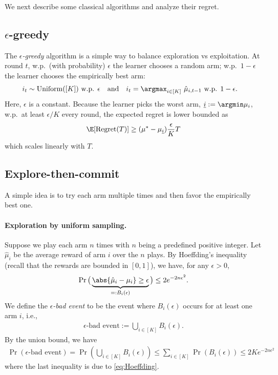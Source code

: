We next describe some classical algorithms and analyze their regret.

\subsection{$\epsilon$-greedy}
The {\em $\epsilon$-greedy} algorithm is a simple way to balance exploration vs exploitation.
At round $t$, w.p.~(with probability) $\epsilon$ the learner chooses a random arm; w.p.~$1-\epsilon$ the learner chooses the empirically best arm:
\begin{align*}
    &i_t \sim {\rm Uniform}([K]) \text{ w.p. $\epsilon$} 
    \quad \text{and} \quad 
    i_t =\textstyle\argmax_{i\in[K]}~\hat{\mu}_{i,t-1} \text{ w.p. $1-\epsilon$}.
\end{align*}
Here, $\epsilon$ is a constant.
Because the learner picks the worst arm, $\underline{i}:=\argmin \mu_i$, w.p.~at least $\epsilon/K$ every round, the expected regret is lower bounded as 
\begin{align}
\label{eq:epsilon_greedy-regret}
    \E[\Regret(T)] \geq (\mu^*-\mu_{\underline{i}})\frac{\epsilon}{K}T
\end{align}
which scales linearly with $T$.

\subsection{Explore-then-commit}
A simple idea is to try each arm multiple times and then favor the empirically best one.
\paragraph{Exploration by uniform sampling.}
Suppose we play each arm $n$ times with $n$ being a predefined positive integer. Let $\hat{\mu}_{i}$ be the average reward of arm $i$ over the $n$ plays.
By Hoeffding's inequality (recall that the rewards are bounded in $[0,1]$),  we have, for any $\epsilon>0$,
\begin{align}
\label{eq:Hoeffding}
    \Pr\big(\underbrace{\abs{\hat{\mu}_i-\mu_i} \geq \epsilon}_{=:B_i(\epsilon)}\big) \leq 2 e^{-2 n \epsilon^2}.
\end{align}
We define the {\em $\epsilon$-bad event} to be the event where $B_i(\epsilon)$ occurs for {at least} one arm $i$, i.e.,
\begin{align*}
    \text{$\epsilon$-bad event} := \textstyle\bigcup_{i\in[K]} B_i(\epsilon).
\end{align*}
By the union bound, we have
\begin{align*}
  \Pr(\text{$\epsilon$-bad event}) 
= \Pr\left(\textstyle\bigcup_{i\in[K]}B_i(\epsilon)\right) 
\leq \textstyle\sum_{i\in[K]} \Pr(B_i(\epsilon))
\leq 2K e^{-2 n \epsilon^2}
\end{align*}
where the last inequality is due to \eqref{eq:Hoeffding}.

